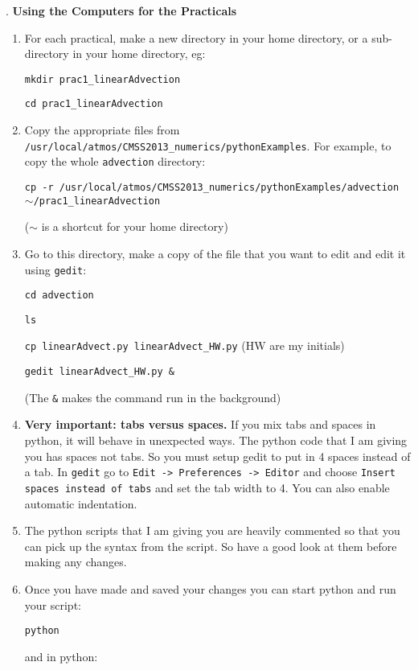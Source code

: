\clearpage
.
\clearpage
{\bf\large Using the Computers for the Practicals}

\begin{enumerate}
\item For each practical, make a new directory in your home directory, or a sub-directory in your home directory, eg:

{\tt mkdir prac1\_linearAdvection}

{\tt cd prac1\_linearAdvection}

\item Copy the appropriate files from\\
{\tt /usr/local/atmos/CMSS2013\_numerics/pythonExamples}. For example, to copy the whole {\tt advection} directory:

{\tt cp -r /usr/local/atmos/CMSS2013\_numerics/pythonExamples/advection $\sim$/prac1\_linearAdvection}

($\sim$ is a shortcut for your home directory)

\item Go to this directory, make a copy of the file that you want to edit and edit it using {\tt gedit}:

{\tt cd advection}

{\tt ls}

{\tt cp linearAdvect.py linearAdvect\_HW.py}    \hfill (HW are my initials)

{\tt gedit linearAdvect\_HW.py \&}

(The {\tt \&} makes the command run in the background)

\item {\bf Very important: tabs versus spaces.} If you mix tabs and spaces in python, it will behave in unexpected ways. The python code that I am giving you has spaces not tabs. So you must setup gedit to put in 4 spaces instead of a tab. In {\tt gedit} go to {\tt Edit -> Preferences -> Editor} and choose {\tt Insert spaces instead of tabs} and set the tab width to 4. You can also enable automatic indentation.

\item The python scripts that I am giving you are heavily commented so that you can pick up the syntax from the script. So have a good look at them before making any changes. 

\item Once you have made and saved your changes you can start python and run your script:

{\tt python}

and in python:


\end{enumerate}
